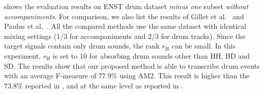 \documentclass{article}
\begin{document}



 shows the evaluation results on ENST drum dataset \textit{minus one} subset \textit{without accompaniments}. For comparison, we also list the results of Gillet et al.\ \cite{gillet_transcription_2008} and Paulus et al.\ \cite{Paulus2009a}. All the compared methods use the same dataset with identical mixing settings (1/3 for accompaniments and 2/3 for drum tracks). Since the target signals contain only drum sounds, the rank $r_\mathrm{H}$ can be small. In this experiment, $r_\mathrm{H}$ is set to 10 for absorbing drum sounds other than HH, BD and SD. The results show that our proposed method is able to transcribe drum events with an average F-measure of $77.9\%$ using AM2. This result is higher than the $73.8\%$ reported in \cite{gillet_transcription_2008}, and at the same level as reported in \cite{Paulus2009a}. %
\end{document}

